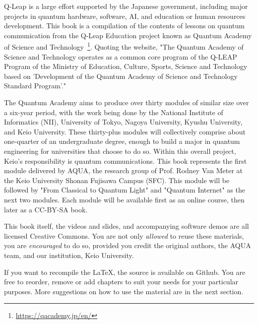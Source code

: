 
\begin{preface}
Q-Leap is a large effort supported by the Japanese government, including major projects in quantum hardware, software, AI, and education or human resources development.  This book is a compilation of the contents of lessons on quantum communication from the Q-Leap Education project known as Quantum Academy of Science and Technology~\footnote{\url{https://qacademy.jp/en/}}. Quoting the website, "The Quantum Academy of Science and Technology operates as a common core program of the Q-LEAP Program of the Ministry of Education, Culture, Sports, Science and Technology based on 'Development of the Quantum Academy of Science and Technology Standard Program'."

The Quantum Academy aims to produce over thirty modules of similar size over a six-year period, with the work being done by the National Institute of Informatics (NII), University of Tokyo, Nagoya University, Kyushu University, and Keio University.  These thirty-plus modules will collectively comprise about one-quarter of an undergraduate degree, enough to build a major in quantum engineering for universities that choose to do so. Within this overall project, Keio's responsibility is quantum communications.  This book represents the first module delivered by AQUA, the research group of Prof. Rodney Van Meter at the Keio University Shonan Fujisawa Campus (SFC).  This module will be followed by "From Classical to Quantum Light" and "Quantum Internet" as the next two modules.  Each module will be available first as an online course, then later as a CC-BY-SA book.

This book itself, the videos and slides, and accompanying software demos are all licensed Creative Commons. You are not only \emph{allowed} to reuse these materials, you are \emph{encouraged} to do so, provided you credit the original authors, the AQUA team, and our institution, Keio University.

If you want to recompile the \LaTeX, the source is available on Github. You are free to reorder, remove or add chapters to suit your needs for your particular purposes.  More suggestions on how to use the material are in the next section.

\author{Michal and Rodney}
\date{sometime in 2023}
\end{preface}

